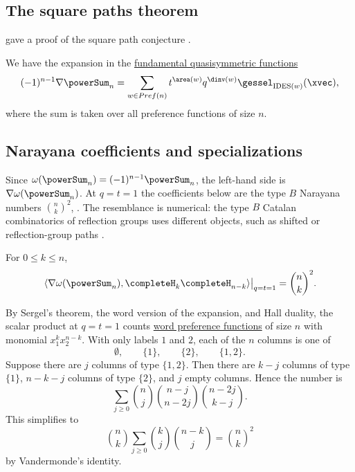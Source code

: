 \subsection[squarePathTheorem]{The square paths theorem}

 gave a proof of the square path conjecture \cite{Sergel2017}.
\begin{theorem}[Sergel (2017)]
We have the expansion in the \hyperref[gessel]{fundamental quasisymmetric functions}
\[
(-1)^{n-1} \nabla \powerSum_n = \sum_{w \in Pref(n)} t^{\area(w)} q^{\dinv(w)} \gessel_{\mathrm{IDES}(w)}(\xvec),
\]
where the sum is taken over all preference functions of size $n$.
\end{theorem}

\subsection[squarePathSpecializations]{Narayana coefficients and specializations}

Since \(\omega(\powerSum_n)=(-1)^{n-1}\powerSum_n\), the left-hand side is
\(\nabla\omega(\powerSum_n)\).  At \(q=t=1\) the coefficients below are the
type \(B\) Narayana numbers \(\binom{n}{k}^2\), .  The
resemblance is numerical: the type \(B\) Catalan combinatorics of
reflection groups uses different objects, such as shifted or
reflection-group paths \cite{Stump2010FussCatalan,Lu2019TypeBCatalan}.

\begin{proposition}[Square-path Narayana coefficients at \(q=t=1\)]
For \(0\leq k\leq n\),
\[
\left.
\langle \nabla\omega(\powerSum_n),
\completeH_k\completeH_{n-k}\rangle
\right|_{q=t=1}
=
\binom{n}{k}^2.
\]
\end{proposition}
\begin{proof*}
By Sergel's theorem, the word version of the expansion, and Hall duality,
the scalar product at \(q=t=1\) counts
\hyperref[wordPreferenceFunctionDefinition]{word preference functions} of size
\(n\) with monomial \(x_1^kx_2^{n-k}\).
With only labels \(1\) and \(2\), each of the \(n\) columns is one of
\[
\emptyset,\qquad \{1\},\qquad \{2\},\qquad \{1,2\}.
\]
Suppose there are \(j\) columns of type \(\{1,2\}\).  Then there are
\(k-j\) columns of type \(\{1\}\), \(n-k-j\) columns of type \(\{2\}\),
and \(j\) empty columns.  Hence the number is
\[
\sum_{j\geq 0}
\binom{n}{j}\binom{n-j}{n-2j}\binom{n-2j}{k-j}.
\]
This simplifies to
\[
\binom{n}{k}\sum_{j\geq0}\binom{k}{j}\binom{n-k}{j}
=\binom{n}{k}^2
\]
by Vandermonde's identity.
\end{proof*}

